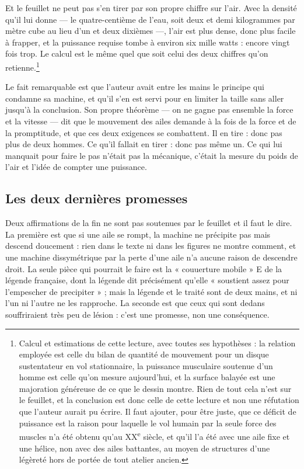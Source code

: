 \documentclass[11pt,a4paper]{article}
\begin{document}
Et le feuillet ne peut pas s'en tirer par son propre chiffre sur l'air. Avec la
densité qu'il lui donne — le quatre-centième de l'eau, soit deux et demi
kilogrammes par mètre cube au lieu d'un et deux dixièmes —, l'air est plus dense,
donc plus facile à frapper, et la puissance requise tombe à environ six mille
watts : encore vingt fois trop. Le calcul est le même quel que soit celui des
deux chiffres qu'on retienne.\footnote{Calcul et estimations de cette lecture,
avec toutes ses hypothèses : la relation employée est celle du bilan de quantité
de mouvement pour un disque sustentateur en vol stationnaire, la puissance
musculaire soutenue d'un homme est celle qu'on mesure aujourd'hui, et la surface
balayée est une majoration généreuse de ce que le dessin montre. Rien de tout
cela n'est sur le feuillet, et la conclusion est donc celle de cette lecture et
non une réfutation que l'auteur aurait pu écrire. Il faut ajouter, pour être
juste, que ce déficit de puissance est la raison pour laquelle le vol humain par
la seule force des muscles n'a été obtenu qu'au XX\textsuperscript{e} siècle, et
qu'il l'a été avec une aile fixe et une hélice, non avec des ailes battantes, au
moyen de structures d'une légèreté hors de portée de tout atelier ancien.}

Le fait remarquable est que l'auteur avait entre les mains le principe qui
condamne sa machine, et qu'il s'en est servi pour en limiter la taille sans aller
jusqu'à la conclusion. Son propre théorème — on ne gagne pas ensemble la force et
la vitesse — dit que le mouvement des ailes demande à la fois de la force et de
la promptitude, et que ces deux exigences se combattent. Il en tire : donc pas
plus de deux hommes. Ce qu'il fallait en tirer : donc pas même un. Ce qui lui
manquait pour faire le pas n'était pas la mécanique, c'était la mesure du poids
de l'air et l'idée de compter une puissance.

\subsection*{Les deux dernières promesses}

Deux affirmations de la fin ne sont pas soutenues par le feuillet et il faut le
dire. La première est que si une aile se rompt, la machine ne précipite pas mais
descend doucement : rien dans le texte ni dans les figures ne montre comment, et
une machine dissymétrique par la perte d'une aile n'a aucune raison de descendre
droit. La seule pièce qui pourrait le faire est la « couuerture mobile » E de la
légende française, dont la légende dit précisément qu'elle « soustient assez pour
l'empescher de precipiter » ; mais la légende et le traité sont de deux mains, et
ni l'un ni l'autre ne les rapproche. La seconde est que ceux qui sont dedans
souffriraient très peu de lésion : c'est une promesse, non une conséquence.
\end{document}
